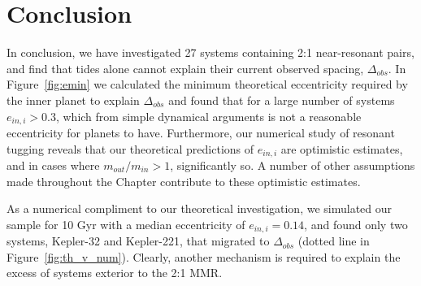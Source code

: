 \section{Conclusion}
\label{sec:Conclusion}
In conclusion, we have investigated 27 \kep{} systems containing 2:1 near-resonant pairs, and find that tides alone cannot explain their current observed spacing, $\Delta_{obs}$. 
In Figure~\ref{fig:emin} we calculated the minimum theoretical eccentricity required by the inner planet to explain $\Delta_{obs}$ and found that for a large number of systems $e_{in,i} > 0.3$, which from simple dynamical arguments is not a reasonable eccentricity for \kep{} planets to have.
Furthermore, our numerical study of resonant tugging reveals that our theoretical predictions of $e_{in,i}$ are optimistic estimates, and in cases where $m_{out}/m_{in} > 1$, significantly so.
A number of other assumptions made throughout the Chapter contribute to these optimistic estimates.

As a numerical compliment to our theoretical investigation, we simulated our \kep{} sample for 10 Gyr with a median eccentricity of $e_{in,i} = 0.14$, and found only two systems, Kepler-32 and Kepler-221, that migrated to $\Delta_{obs}$ (dotted line in Figure~\ref{fig:th_v_num}).
Clearly, another mechanism is required to explain the excess of \kep{} systems exterior to the 2:1 MMR. 
